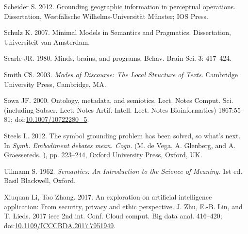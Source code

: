 \documentclass[a4paper,11pt,oneside,oldfontcommands]{memoir}
\theoremstyle{definition}
\theoremstyle{break}		%
\numberwithin{equation}{chapter}
\numberwithin{figure}{chapter}
\begin{document}
\leavevmode\hypertarget{ref-Scheider:2012tj}{}%
Scheider S. 2012. Grounding geographic information in perceptual
operations. Dissertation, Westfälische Wilhelms-Universität Münster; IOS
Press.

\leavevmode\hypertarget{ref-Schulz2007}{}%
Schulz K. 2007. Minimal Models in Semantics and Pragmatics.
Dissertation, Universiteit van Amsterdam.

\leavevmode\hypertarget{ref-Searle:1980hw}{}%
Searle JR. 1980. Minds, brains, and programs. Behav. Brain Sci. 3:
417--424.

\leavevmode\hypertarget{ref-smith2003}{}%
Smith CS. 2003. \emph{Modes of Discourse: The Local Structure of Texts}.
Cambridge University Press, Cambridge, MA.

\leavevmode\hypertarget{ref-Sowa:2000di}{}%
Sowa JF. 2000. Ontology, metadata, and semiotics. Lect. Notes Comput.
Sci. (including Subser. Lect. Notes Artif. Intell. Lect. Notes
Bioinformatics) 1867:55--81;
doi:\href{https://doi.org/10.1007/10722280_5}{10.1007/10722280\_5}.

\leavevmode\hypertarget{ref-Steels:2008tr}{}%
Steels L. 2012. The symbol grounding problem has been solved, so what's
next. In \emph{Symb. Embodiment debates mean. Cogn.} (M. de Vega, A.
Glenberg, and A. Graessereds. ), pp. 223--244, Oxford University Press,
Oxford, UK.

\leavevmode\hypertarget{ref-Ullmann:1979sL}{}%
Ullmann S. 1962. \emph{Semantics: An Introduction to the Science of
Meaning}. 1st ed. Basil Blackwell, Oxford.

\leavevmode\hypertarget{ref-XiuquanLi2017}{}%
Xiuquan Li, Tao Zhang. 2017. An exploration on artificial intelligence
application: From security, privacy and ethic perspective. J. Zhu, E.-B.
Lin, and T. Lieds. 2017 ieee 2nd int. Conf. Cloud comput. Big data anal.
416--420;
doi:\href{https://doi.org/10.1109/ICCCBDA.2017.7951949}{10.1109/ICCCBDA.2017.7951949}.



\printindex

\end{document}
